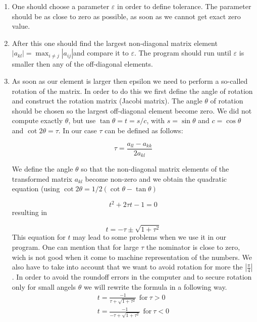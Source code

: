 \documentclass[10pt]{article}
\begin{document}
\begin{enumerate}
\item One should choose a parameter $\varepsilon $ in order to define tolerance. The parameter should be as close to zero as possible, as soon as we cannot get exact zero value.

\item After this one should find the largest non-diagonal matrix element $\left\vert
a_{kl}\right\vert =\max\nolimits_{i\neq j}\left\vert a_{ij}\right\vert $and
compare it to $\varepsilon $. The program should run until $\varepsilon $ is smaller then any of the off-diagonal elements.

\item As soon as our element is larger then epsilon we need to perform a so-called rotation of the matrix. In order to do this we first define the angle of rotation and construct the rotation matrix (Jacobi matrix). The angle $\theta $ of rotation should be chosen so the largest off-diagonal element become zero.
We did not compute exactly $\theta $, but use $%
\tan \theta =t=s/c$, with $s=\sin \theta $ and $c=\cos \theta $ and $\cot
2\theta =\tau $. 
In our case $\tau $ can be defined as follows:

\begin{equation}
\tau =\frac{a_{ll}-a_{kk}}{2a_{kl}}
\end{equation}%

We define the angle $\theta $ so that the non-diagonal matrix
elements of the transformed matrix $a_{kl}$ become non-zero and we obtain
the quadratic equation (using $\cot 2\theta =1/2(\cot \theta -\tan \theta )$

\begin{equation}
t^{2}+2\tau t-1=0
\end{equation}
resulting in

\begin{equation}
t=-\tau \pm \sqrt{1+\tau ^{2}}
\end{equation}
This equation for $ t $ may lead to some problems when we use it in our program. One can mention that for large $ \tau $ the nominator is close to zero, wich is not good when it come to machine representation of the numbers. We also have to take into account that we want to avoid rotation for more the $ |\frac{\pi}{4}|$. In order to avoid the roundoff errors in the computer and to secure rotation only for small angels $ \theta $ we will rewrite the formula in a following way.
\begin{gather*}
t=\frac{-1}{\tau+\sqrt{1+\tau^{2}}}\,\ \text{for} \  \tau>0 \\
t=\frac{-1}{-\tau+\sqrt{1+\tau^{2}}}\,\ \text{for} \ \tau<0
\end{gather*}



\end{enumerate}
\end{document}
